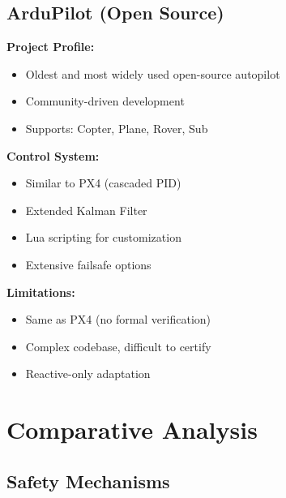 \subsection{ArduPilot (Open Source)}

\textbf{Project Profile:}
\begin{itemize}
    \item Oldest and most widely used open-source autopilot
    \item Community-driven development
    \item Supports: Copter, Plane, Rover, Sub
\end{itemize}

\textbf{Control System:}
\begin{itemize}
    \item Similar to PX4 (cascaded PID)
    \item Extended Kalman Filter
    \item Lua scripting for customization
    \item Extensive failsafe options
\end{itemize}

\textbf{Limitations:}
\begin{itemize}
    \item Same as PX4 (no formal verification)
    \item Complex codebase, difficult to certify
    \item Reactive-only adaptation
\end{itemize}

\section{Comparative Analysis}

\subsection{Safety Mechanisms}

